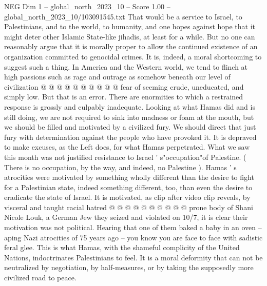 \begin{textsample}{NEG Dim 1 – global\_north\_2023\_10 – Score 1.00 – global\_north\_2023\_10/103091545.txt}
That would be a service to Israel, to Palestinians, and to the world, to humanity, and one hopes against hope that it might deter other Islamic State-like jihadis, at least for a while.
But no one can reasonably argue that it is morally proper to allow the continued existence of an organization committed to genocidal crimes.
It is, indeed, a moral shortcoming to suggest such a thing.
In America and the Western world, we tend to flinch at high passions such as rage and outrage as somehow beneath our level of civilization @ @ @ @ @ @ @ @ @ @ fear of seeming crude, uneducated, and simply low.
But that is an error.
There are enormities to which a restrained response is grossly and culpably inadequate.
Looking at what Hamas did and is still doing, we are not required to sink into madness or foam at the mouth, but we should be filled and motivated by a civilized fury.
We should direct that just fury with determination against the people who have provoked it.
It is depraved to make excuses, as the Left does, for what Hamas perpetrated.
What we saw this month was not justified resistance to Israel ' s"occupation"of Palestine. ( There is no occupation, by the way, and indeed, no Palestine ).
Hamas ' s atrocities were motivated by something wholly different than the desire to fight for a Palestinian state, indeed something different, too, than even the desire to eradicate the state of Israel.
It is motivated, as clip after video clip reveals, by visceral and taught racial hatred @ @ @ @ @ @ @ @ @ @ prone body of Shani Nicole Louk, a German Jew they seized and violated on 10/7, it is clear their motivation was not political.
Hearing that one of them baked a baby in an oven -- aping Nazi atrocities of 75 years ago -- you know you are face to face with sadistic feral glee.
This is what Hamas, with the shameful complicity of the United Nations, indoctrinates Palestinians to feel.
It is a moral deformity that can not be neutralized by negotiation, by half-measures, or by taking the supposedly more civilized road to peace.

\end{textsample}
